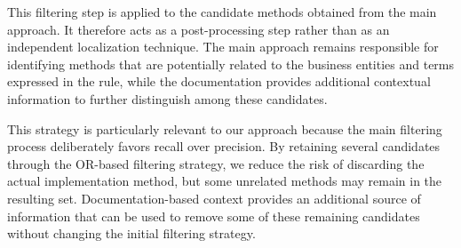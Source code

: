 This filtering step is applied to the candidate methods obtained from the main approach. It therefore acts as a post-processing step rather than as an independent localization technique. The main approach remains responsible for identifying methods that are potentially related to the business entities and terms expressed in the rule, while the documentation provides additional contextual information to further distinguish among these candidates.

This strategy is particularly relevant to our approach because the main filtering process deliberately favors recall over precision. By retaining several candidates through the OR-based filtering strategy, we reduce the risk of discarding the actual implementation method, but some unrelated methods may remain in the resulting set. Documentation-based context provides an additional source of information that can be used to remove some of these remaining candidates without changing the initial filtering strategy.